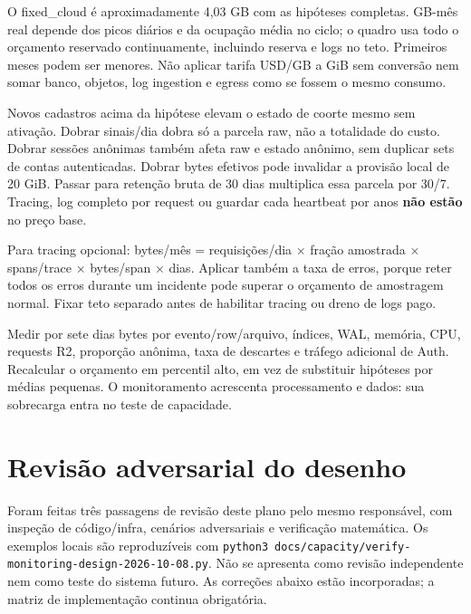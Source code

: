 \documentclass[10pt,a4paper]{article}
\begin{document}
O fixed\_cloud é aproximadamente 4,03 GB com as hipóteses completas.
GB-mês real depende dos picos diários e da ocupação média no ciclo; o
quadro usa todo o orçamento reservado continuamente, incluindo reserva e
logs no teto. Primeiros meses podem ser menores. Não aplicar tarifa
USD/GB a GiB sem conversão nem somar banco, objetos, log ingestion e
egress como se fossem o mesmo consumo.

Novos cadastros acima da hipótese elevam o estado de coorte mesmo sem
ativação. Dobrar sinais/dia dobra só a parcela raw, não a totalidade do
custo. Dobrar sessões anônimas também afeta raw e estado anônimo, sem
duplicar sets de contas autenticadas. Dobrar bytes efetivos pode
invalidar a provisão local de 20 GiB. Passar para retenção bruta de 30
dias multiplica essa parcela por 30/7. Tracing, log completo por request
ou guardar cada heartbeat por anos \textbf{não estão} no preço base.

Para tracing opcional: bytes/mês = requisições/dia × fração amostrada ×
spans/trace × bytes/span × dias. Aplicar também a taxa de erros, porque
reter todos os erros durante um incidente pode superar o orçamento de
amostragem normal. Fixar teto separado antes de habilitar tracing ou
dreno de logs pago.

Medir por sete dias bytes por evento/row/arquivo, índices, WAL, memória,
CPU, requests R2, proporção anônima, taxa de descartes e tráfego
adicional de Auth. Recalcular o orçamento em percentil alto, em vez de
substituir hipóteses por médias pequenas. O monitoramento acrescenta
processamento e dados: sua sobrecarga entra no teste de capacidade.

\clearpage
\section{Revisão adversarial do
desenho}\label{revisuxe3o-adversarial-do-desenho}

Foram feitas três passagens de revisão deste plano pelo mesmo
responsável, com inspeção de código/infra, cenários adversariais e
verificação matemática. Os exemplos locais são reproduzíveis com
{\footnotesize\ttfamily\nolinkurl{python3}\ \nolinkurl{docs/capacity/verify-monitoring-design-2026-10-08.py}}.
Não se apresenta como revisão independente nem como teste do sistema
futuro. As correções abaixo estão incorporadas; a matriz de
implementação continua obrigatória.
\end{document}
